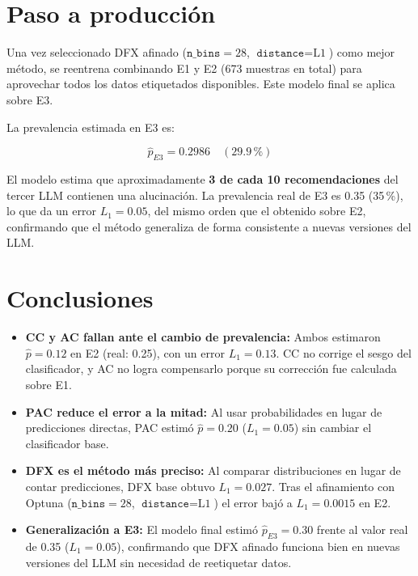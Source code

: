 \documentclass[11pt,a4paper]{article}
\begin{document}
\section{Paso a producción}

Una vez seleccionado DFX afinado ($\texttt{n\_bins}=28$,
$\texttt{distance}=\text{L1}$) como mejor método, se reentrena combinando
E1 y E2 (673 muestras en total) para aprovechar todos los datos etiquetados
disponibles. Este modelo final se aplica sobre E3.

La prevalencia estimada en E3 es:

\begin{equation}
    \hat{p}_{E3} = 0.2986 \quad (29.9\,\%)
\end{equation}

El modelo estima que aproximadamente \textbf{3 de cada 10 recomendaciones}
del tercer LLM contienen una alucinación. La prevalencia real de E3 es 0.35
(35\,\%), lo que da un error $L_1 = 0.05$, del mismo orden que el obtenido
sobre E2, confirmando que el método generaliza de forma consistente a nuevas
versiones del LLM.


\section{Conclusiones}

\begin{itemize}
    \item \textbf{CC y AC fallan ante el cambio de prevalencia:} Ambos
    estimaron $\hat{p} = 0.12$ en E2 (real: 0.25), con un error
    $L_1 = 0.13$. CC no corrige el sesgo del clasificador, y AC no logra
    compensarlo porque su corrección fue calculada sobre E1.

    \item \textbf{PAC reduce el error a la mitad:} Al usar probabilidades
    en lugar de predicciones directas, PAC estimó $\hat{p} = 0.20$
    ($L_1 = 0.05$) sin cambiar el clasificador base.

    \item \textbf{DFX es el método más preciso:} Al comparar distribuciones
    en lugar de contar predicciones, DFX base obtuvo $L_1 = 0.027$. Tras
    el afinamiento con Optuna ($\texttt{n\_bins}=28$,
    $\texttt{distance}=\text{L1}$) el error bajó a $L_1 = 0.0015$ en E2.

    \item \textbf{Generalización a E3:} El modelo final estimó
    $\hat{p}_{E3} = 0.30$ frente al valor real de 0.35 ($L_1 = 0.05$),
    confirmando que DFX afinado funciona bien en nuevas versiones del LLM
    sin necesidad de reetiquetar datos.
\end{itemize}
\end{document}
